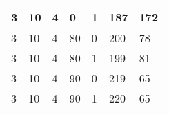 \documentclass{article}
\theoremstyle{definition}
\begin{document}
\begin{table}[]
\begin{tabular}{|l|l|l|l|l|l|l|}
3                                      & 10                                      & 4                                      & 0                                    & 1                                      & 187                                      & 172                                    \\ \hline
3                                      & 10                                      & 4                                      & 80                                   & 0                                      & 200                                      & 78                                     \\ \hline
3                                      & 10                                      & 4                                      & 80                                   & 1                                      & 199                                      & 81                                     \\ \hline
3                                      & 10                                      & 4                                      & 90                                   & 0                                      & 219                                      & 65                                     \\ \hline
3                                      & 10                                      & 4                                      & 90                                   & 1                                      & 220                                      & 65                                     \\ \hline
\end{tabular}
\end{table}
\end{document}
